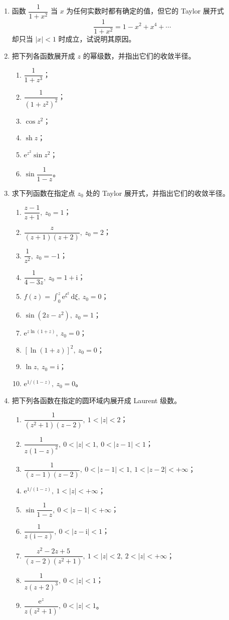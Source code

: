 \documentclass[UTF8,11pt,a4paper]{ctexart}
\newcommand{\dd}{\,\mathrm{d}}
\newcommand{\ee}{\mathrm{e}}
\newcommand{\ii}{\mathrm{i}}
\newcommand{\sh}{\operatorname{sh}}
\begin{document}
\begin{enumerate}
\item 函数 $\dfrac1{1+x^2}$ 当 $x$ 为任何实数时都有确定的值，但它的 Taylor 展开式
\[
\frac1{1+x^2}=1-x^2+x^4+\cdots
\]
却只当 $|x|<1$ 时成立，试说明其原因。

\item 把下列各函数展开成 $z$ 的幂级数，并指出它们的收敛半径。
  \begin{enumerate}
  \item $\dfrac1{1+z^3}$；
  \item $\dfrac1{(1+z^2)^2}$；
  \item $\cos z^2$；
  \item $\sh z$；
  \item $\ee^{z^2}\sin z^2$；
  \item $\sin\dfrac1{1-z}$。
  \end{enumerate}

\item 求下列函数在指定点 $z_0$ 处的 Taylor 展开式，并指出它们的收敛半径。
  \begin{enumerate}
  \item $\dfrac{z-1}{z+1},\ z_0=1$；
  \item $\dfrac z{(z+1)(z+2)},\ z_0=2$；
  \item $\dfrac1{z^2},\ z_0=-1$；
  \item $\dfrac1{4-3z},\ z_0=1+\ii$；
  \item $f(z)=\displaystyle\int_0^z\ee^{\xi^2}\dd\xi,\ z_0=0$；
  \item $\sin(2z-z^2),\ z_0=1$；
  \item $\ee^{z\ln(1+z)},\ z_0=0$；
  \item $[\ln(1+z)]^2,\ z_0=0$；
  \item $\ln z,\ z_0=\ii$；
  \item $\ee^{1/(1-z)},\ z_0=0$。
  \end{enumerate}

\item 把下列各函数在指定的圆环域内展开成 Laurent 级数。
  \begin{enumerate}
  \item $\dfrac1{(z^2+1)(z-2)},\ 1<|z|<2$；
  \item $\dfrac1{z(1-z)^2},\ 0<|z|<1,\ 0<|z-1|<1$；
  \item $\dfrac1{(z-1)(z-2)},\ 0<|z-1|<1,\ 1<|z-2|<+\infty$；
  \item $\ee^{1/(1-z)},\ 1<|z|<+\infty$；
  \item $\sin\dfrac1{1-z},\ 0<|z-1|<+\infty$；
  \item $\dfrac1{z(\ii-z)},\ 0<|z-\ii|<1$；
  \item $\dfrac{z^2-2z+5}{(z-2)(z^2+1)},\ 1<|z|<2,\ 2<|z|<+\infty$；
  \item $\dfrac1{z(z+2)^3},\ 0<|z|<1$；
  \item $\dfrac{\ee^z}{z(z^2+1)},\ 0<|z|<1$。
  \end{enumerate}


\end{enumerate}
\end{document}

